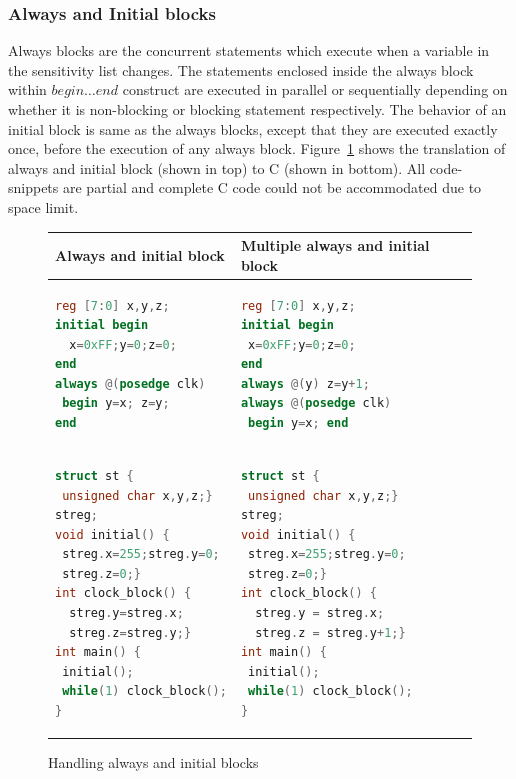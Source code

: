 \subsubsection{Always and Initial blocks}
Always blocks are the concurrent statements which execute when a 
variable in the sensitivity list changes. The statements enclosed inside the 
always block within $begin \ldots end$ construct are executed in parallel
or sequentially depending on whether it is non-blocking or blocking statement 
respectively.   The behavior of an initial block is same as the always blocks, 
except that they are executed exactly once, before the execution of any 
always block. Figure~\ref{figure:always-init} shows the translation of always
and initial block (shown in top) to C (shown in bottom). All code-snippets are
partial and complete C code could not be accommodated due to space limit.
%
\begin{figure}[htbp]
\scriptsize
\begin{tabular}{l|l}
\hline
Always and initial block & Multiple always and initial block\\
\hline
\begin{lstlisting}[mathescape=true,language=Verilog]
reg [7:0] x,y,z;
initial begin  
  x=0xFF;y=0;z=0; 
end
always @(posedge clk) 
 begin y=x; z=y;
end
\end{lstlisting}
& 
\begin{lstlisting}[mathescape=true,language=Verilog]
reg [7:0] x,y,z;
initial begin  
 x=0xFF;y=0;z=0; 
end
always @(y) z=y+1;
always @(posedge clk) 
 begin y=x; end
\end{lstlisting}
\\
\hline 
\begin{lstlisting}[mathescape=true,language=C]
struct st {
 unsigned char x,y,z;} 
streg;
void initial() {
 streg.x=255;streg.y=0;
 streg.z=0;}
int clock_block() {
  streg.y=streg.x; 
  streg.z=streg.y;}
int main() {
 initial();
 while(1) clock_block();
}
\end{lstlisting}
&
\begin{lstlisting}[mathescape=true,language=C]
struct st {
 unsigned char x,y,z;} 
streg;
void initial() { 
 streg.x=255;streg.y=0;
 streg.z=0;}
int clock_block() {
  streg.y = streg.x; 
  streg.z = streg.y+1;}
int main() {
 initial();
 while(1) clock_block();
} 
\end{lstlisting}
\\
\hline
\end{tabular}
\caption{Handling always and initial blocks}
\label{figure:always-init}
\end{figure}



